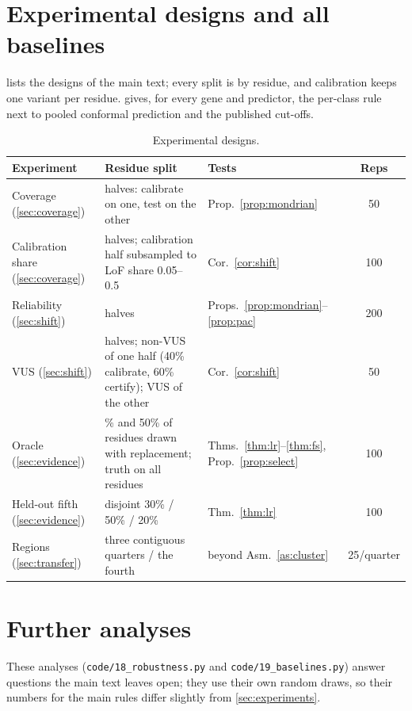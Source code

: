 \section{Experimental designs and all baselines}\label{s:designs}
 lists the designs of the main text; every split is by residue, and calibration keeps one variant per
residue.  gives, for every gene and predictor, the per-class rule next to pooled conformal prediction and
the published cut-offs.

\begin{table}[ht]
\centering
\caption{Experimental designs.}\label{tab:designs}
\setlength{\tabcolsep}{4pt}
\begin{tabular}{>{\raggedright\arraybackslash}p{3.1cm}>{\raggedright\arraybackslash}p{6.5cm}>{\raggedright\arraybackslash}p{2.9cm}c}
\toprule
Experiment & Residue split & Tests & Reps\\
\midrule
Coverage (\ref{sec:coverage}) & halves: calibrate on one, test on the other & Prop.~\ref{prop:mondrian} & 50\\
Calibration share (\ref{sec:coverage}) & halves; calibration half subsampled to LoF share 0.05--0.5 & Cor.~\ref{cor:shift} & 100\\
Reliability (\ref{sec:shift}) & halves & Props.~\ref{prop:mondrian}--\ref{prop:pac} & 200\\
VUS (\ref{sec:shift}) & halves; non-VUS of one half (40\% calibrate, 60\% certify); VUS of the other & Cor.~\ref{cor:shift} & 50\\
Oracle (\ref{sec:evidence}) & 30\% and 50\% of residues drawn with replacement; truth on all residues & Thms.~\ref{thm:lr}--\ref{thm:fs}, Prop.~\ref{prop:select} & 100\\
Held-out fifth (\ref{sec:evidence}) & disjoint 30\% / 50\% / 20\% & Thm.~\ref{thm:lr} & 100\\
Regions (\ref{sec:transfer}) & three contiguous quarters / the fourth & beyond Asm.~\ref{as:cluster} & 25/quarter\\
\bottomrule
\end{tabular}
\end{table}



\section{Further analyses}\label{s:extra}
These analyses (\texttt{code/18\_robustness.py} and \texttt{code/19\_baselines.py}) answer questions the main text
leaves open; they use their own random draws, so their numbers for the main rules differ slightly from
\cref{sec:experiments}.

